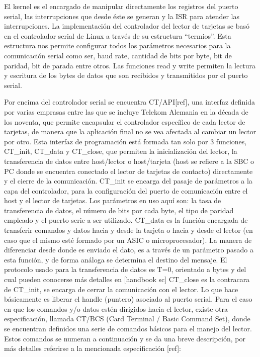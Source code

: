 \bigskip
{}

\bigskip
{}
El kernel es el encargado de manipular directamente los registros del puerto serial, las interrupciones que desde éste se generan y la ISR para atender las interrupciones.
La implementación del controlador del lector de tarjetas se basó en el controlador serial de Linux a través de su estructura “termios”. Esta estructura nos permite configurar todos los parámetros necesarios para la comunicación serial como ser, baud rate, cantidad de bits por byte, bit de paridad, bit de parada entre otros. Las funciones read y write permiten la lectura y escritura de los bytes de datos que son recibidos y transmitidos por el puerto serial.

\bigskip
{}
Por encima del controlador serial se encuentra CT/API[ref], una interfaz definida por varias emprasas entre las que se incluye Telekom Alemania en la década de los noventa, que permite encapsular el controlador específico de cada lector de tarjetas, de manera que la aplicación final no se vea afectada al cambiar un lector por otro.
Esta interfaz de programación está formada tan solo por 3 funciones, CT\_init, CT\_data y CT\_close, que permiten la inicialización del lector, la transferencia de datos entre host/lector o host/tarjeta (host se refiere a la SBC o PC donde se encuentra conectado el lector de tarjetas de contacto) directamente y el cierre de la comunicación.
CT\_init se encarga del pasaje de parámetros a la capa del controlador, para la configuración del puerto de comunicación entre el host y el lector de tarjetas. Los parámetros en uso aquí son: la tasa de transferencia de datos, el número de bits por cada byte, el tipo de paridad empleado y el puerto serie a ser utilizado.
CT\_data es la función encargada de transferir comandos y datos hacia y desde la tarjeta o hacia y desde el lector (en caso que el mismo esté formado por un ASIC o microprocesador). La manera de diferenciar desde donde es enviado el dato, es a través de un parámetro pasado a esta función, y de forma análoga se determina el destino del mensaje. El protocolo usado para la transferencia de datos es T=0, orientado a bytes y del cual pueden conocerse más detalles en [handbook sc]
CT\_close es la contracara de  CT\_init, se encarga de cerrar la comunicación con el lector. Lo que hace básicamente es liberar el handle (puntero) asociado al puerto serial.
Para el caso en que los comandos y/o datos estén dirigidos hacia el lector, existe otra especificación, llamada CT/BCS (Card Terminal / Basic Command Set), donde se encuentran definidos una serie de comandos básicos para el manejo del lector. Estos comandos se numeran a continuación y se da una breve descripción, por más detalles referirse a la mencionada especificación [ref]:


